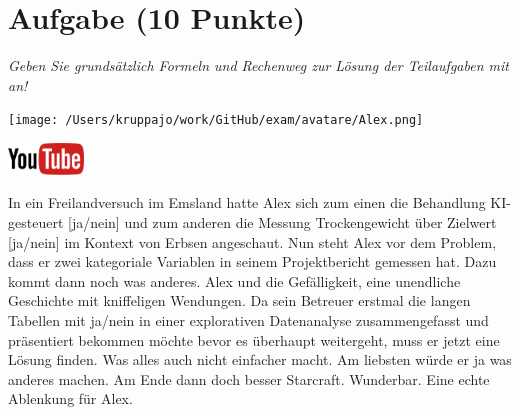 \documentclass[a4paper, 9pt]{scrartcl}\usepackage[]{graphicx}\usepackage[]{xcolor}
\begin{document}
\section{Aufgabe \hfill (10 Punkte)}

\textit{Geben Sie grundsätzlich Formeln und Rechenweg zur Lösung der Teilaufgaben mit an!} \\[1Ex]
 

 
\begin{minipage}[t]{0.5\textwidth}
\texttt{[image: /Users/kruppajo/work/GitHub/exam/avatare/Alex.png]}
\end{minipage}
\begin{minipage}[t]{0.5\textwidth}
\hfill
\href{https://youtu.be/t_1KL77mfmg}{\includegraphics[width = 2cm]{img/youtube}}\\[1Ex]
\end{minipage}
\vspace{1ex}



In ein Freilandversuch im Emsland hatte Alex sich zum einen die Behandlung KI-gesteuert [ja/nein] und zum anderen die Messung Trockengewicht über Zielwert [ja/nein] im Kontext von Erbsen angeschaut. Nun steht Alex vor dem Problem, dass er zwei kategoriale Variablen in seinem Projektbericht gemessen hat. Dazu kommt dann noch was anderes. Alex und die Gefälligkeit, eine unendliche Geschichte mit kniffeligen Wendungen. Da sein Betreuer erstmal die langen Tabellen mit ja/nein in einer explorativen Datenanalyse zusammengefasst und präsentiert bekommen möchte bevor es überhaupt weitergeht, muss er jetzt eine Lösung finden. Was alles auch nicht einfacher macht. Am liebsten würde er ja was anderes machen. Am Ende dann doch besser Starcraft. Wunderbar. Eine echte Ablenkung für Alex.



\vspace{1Ex}
\end{document}
